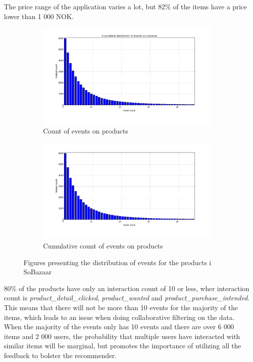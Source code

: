         The price range of the application varies a lot, but 82\% of the items have a price lower than 1 000 NOK.

    \begin{figure}[H]
        \centering
        \begin{subfigure}{.5\textwidth}
            \includegraphics[width=\dualGraphWidth]{image/product_iddistribution.png}
            \centering
            \caption{Count of events on products}
    \label{figure:eventsPerproduct}
        \end{subfigure}%
        \begin{subfigure}{.5\textwidth}
            \includegraphics[width=\dualGraphWidth]{image/product_idcumdistribution.png}
            \centering
            \caption{Cumulative count of events on products}
    \label{figure:eventsPerproductCum}
        \end{subfigure}
        \caption{Figures presenting the distribution of events for the products i SoBazaar}
    \end{figure}
        80\% of the products have only an interaction count of 10 or less, wher interaction count is \emph{product\_detail\_clicked}, \emph{product\_wanted} and \emph{product\_purchase\_intended}.
        This means that there will not be more than 10 events for the majority of the items, which leads to an issue when doing collaborative filtering on the data.
        When the majority of the events only has 10 events and there are over 6 000 items and 2 000 users, the probability that multiple users have interacted with similar items will be marginal, but promotes the importance of utilizing all the feedback to bolster the recommender.

